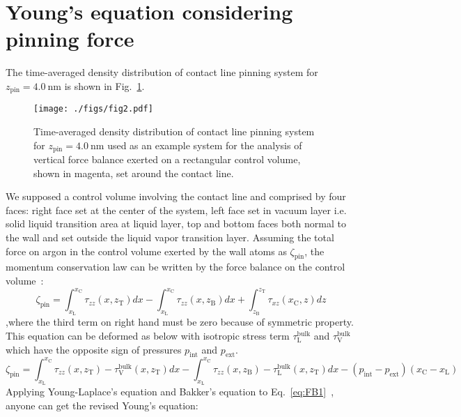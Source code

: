 \label{sec:result}
\section{Young's equation considering pinning force}
The time-averaged density distribution of
contact line pinning system for $z_\text{pin}=4.0~\text{nm}$ is shown in Fig.~\ref{fig:dens}.
\begin{figure}
  \begin{center}
    \texttt{[image: ./figs/fig2.pdf]}
  \end{center} 
  \caption{\label{fig:dens}
Time-averaged density distribution of contact line pinning system for $z_\text{pin}=4.0~\text{nm}$
used as an example system for the analysis of vertical force balance exerted on a rectangular control volume, shown in magenta, set around the contact line.
  }
\end{figure}
We supposed a control volume involving the contact line and comprised by four faces:
right face set at the center of the system,
left face set in vacuum layer i.e. solid liquid transition area at liquid layer,
top and bottom faces both normal to the wall and set outside the liquid vapor transition layer.
Assuming the total force on argon in the control volume exerted by the wall atoms as $\zeta_{\text{pin}}$,
the momentum conservation law can be written by the force balance on the control volume~\cite{Yamaguchi2019}:
\begin{equation}
\zeta_\text{pin}=\int_{x_{\text{L}}}^{x_{\text{C}}}\tau_{zz}(x,z_\text{T})dx-
\int_{x_{\text{L}}}^{x_{\text{C}}}\tau_{zz}(x,z_\text{B})dx+
\int_{z_{\text{B}}}^{z_{\text{T}}}\tau_{xz}(x_{\text{C}},z)dz
\end{equation}
,where the third term on right hand must be zero because of symmetric property.
This equation can be deformed as below with isotropic stress term $\tau^{\text{bulk}}_{\text{L}}$ and $\tau^{\text{bulk}}_{\text{V}}$
which have the opposite sign of pressures $p_{\text{int}}$ and $p_{\text{ext}}$.
\begin{equation}
\label{eq:FB1}
\zeta_\text{pin}=\int_{x_{\text{L}}}^{x_{\text{C}}}\tau_{zz}(x,z_\text{T})-\tau^{\text{bulk}}_{\text{V}}(x,z_\text{T})dx-
\int_{x_{\text{L}}}^{x_{\text{C}}}\tau_{zz}(x,z_\text{B})-\tau^{\text{bulk}}_{\text{L}}(x,z_\text{T})dx-
(p_{\text{int}}-p_{\text{ext}})(x_{\text{C}}-x_{\text{L}})
\end{equation}
Applying Young-Laplace's equation and Bakker's equation to Eq.~\eqref{eq:FB1}~\cite{Yamaguchi2019}, 
anyone can get the revised Young's equation:
